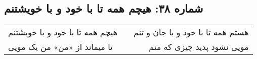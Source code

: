 \begin{center}
\section*{شماره ۳۸: هیچم همه تا با خود و با خویشتنم}
\label{sec:038}
\begin{longtable}{l p{0.5cm} r}
هیچم همه تا با خود و با خویشتنم
&&
هستم همه تا با خود و با جان و تنم
\\
تا میماند از «من» من یک مویی
&&
مویی نشود پدید چیزی که منم
\\
\end{longtable}
\end{center}
